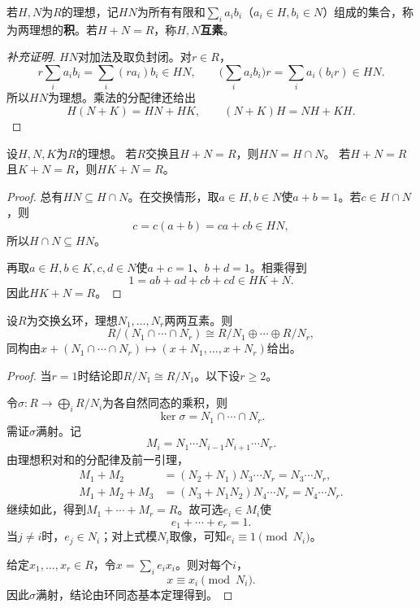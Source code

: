 \begin{definition}
若$H,N$为$R$的理想，记$HN$为所有有限和$\sum_i a_ib_i$（$a_i\in H,b_i\in N$）组成的集合，称为两理想的\textbf{积}。若$H+N=R$，称$H,N$\textbf{互素}。
\end{definition}
\begin{proof}[补充证明]
$HN$对加法及取负封闭。对$r\in R$，
\[
r\sum_i a_ib_i=\sum_i(ra_i)b_i\in HN,\qquad
\biggl(\sum_i a_ib_i\biggr)r=\sum_i a_i(b_ir)\in HN.
\]
所以$HN$为理想。乘法的分配律还给出
\[
H(N+K)=HN+HK,\qquad (N+K)H=NH+KH.
\]
\end{proof}

\begin{lemma}\label{p2:ring-comaximal-product}
设$H,N,K$为$R$的理想。
若$R$交换且$H+N=R$，则$HN=H\cap N$。
若$H+N=R$且$K+N=R$，则$HK+N=R$。
\end{lemma}
\begin{proof}
总有$HN\subseteq H\cap N$。在交换情形，取$a\in H,b\in N$使$a+b=1$。若$c\in H\cap N$，则
\[
c=c(a+b)=ca+cb\in HN,
\]
所以$H\cap N\subseteq HN$。

再取$a\in H,b\in K,c,d\in N$使$a+c=1$、$b+d=1$。相乘得到
\[
1=ab+ad+cb+cd\in HK+N.
\]
因此$HK+N=R$。
\end{proof}

\begin{theorem}\label{p2:ring-crt}
设$R$为交换幺环，理想$N_1,\ldots,N_r$两两互素。则
\[
R/(N_1\cap\cdots\cap N_r)\cong R/N_1\oplus\cdots\oplus R/N_r,
\]
同构由$x+(N_1\cap\cdots\cap N_r)\mapsto(x+N_1,\ldots,x+N_r)$给出。
\end{theorem}
\begin{proof}
当$r=1$时结论即$R/N_1\cong R/N_1$。以下设$r\geq2$。

令$\sigma:R\to\bigoplus_iR/N_i$为各自然同态的乘积，则
\[
\ker\sigma=N_1\cap\cdots\cap N_r.
\]
需证$\sigma$满射。记
\[
M_i=N_1\cdots N_{i-1}N_{i+1}\cdots N_r.
\]
由理想积对和的分配律及前一引理，
\begin{align*}
M_1+M_2
&=(N_2+N_1)N_3\cdots N_r=N_3\cdots N_r,\\
M_1+M_2+M_3
&=(N_3+N_1N_2)N_4\cdots N_r=N_4\cdots N_r.
\end{align*}
继续如此，得到$M_1+\cdots+M_r=R$。故可选$e_i\in M_i$使
\[
e_1+\cdots+e_r=1.
\]
当$j\ne i$时，$e_j\in N_i$；对上式模$N_i$取像，可知$e_i\equiv1\pmod{N_i}$。

给定$x_1,\ldots,x_r\in R$，令$x=\sum_i e_ix_i$。则对每个$i$，
\[
x\equiv x_i\pmod{N_i}.
\]
因此$\sigma$满射，结论由环同态基本定理得到。
\end{proof}

